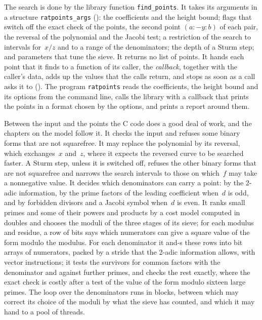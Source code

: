 The search is done by the library function \verb|find_points|. It takes its arguments in a
structure \verb|ratpoints_args| (): the coefficients and the height
bound; flags that switch off the exact check of the points, the second point $(a : -y : b)$ of each
pair, the reversal of the polynomial and the Jacobi test; a restriction of the search to intervals
for~$x/z$ and to a range of the denominators; the depth of a Sturm step; and parameters that tune
the sieve. It returns no list of points. It hands each point that it finds to a function of its
caller, the \emph{callback}, together with the caller's data, adds up the values that the calls
return, and stops as soon as a call asks it to (). The program
\verb|ratpoints| reads the coefficients, the height bound and its options from the command line,
calls the library with a callback that prints the points in a format chosen by the options, and
prints a report around them.

Between the input and the points the C code does a good deal of work, and the chapters on the model
follow it. It checks the input and refuses some binary forms that are not squarefree. It may replace
the polynomial by its reversal, which exchanges~$x$ and~$z$, where it expects the reversed curve to
be searched faster. A Sturm step, unless it is switched off, refuses the other binary forms that are
not squarefree and narrows the search intervals to those on which~$f$ may take a nonnegative value.
It decides which denominators can carry a point: by the 2-adic information, by the prime factors of
the leading coefficient when~$d$ is odd, and by forbidden divisors and a Jacobi symbol when~$d$ is
even. It ranks small primes and some of their powers and products by a cost model computed in
doubles and chooses the moduli of the three stages of its sieve; for each modulus and residue, a row
of bits says which numerators can give a square value of the form modulo the modulus. For each
denominator it and-s these rows into bit arrays of numerators, packed by a stride that the 2-adic
information allows, with vector instructions; it tests the survivors for common factors with the
denominator and against further primes, and checks the rest exactly, where the exact check is costly
after a test of the value of the form modulo sixteen large primes. The loop over the denominators
runs in blocks, between which \ratpoints{} may correct its choice of the moduli by what the sieve
has counted, and which it may hand to a pool of threads.

